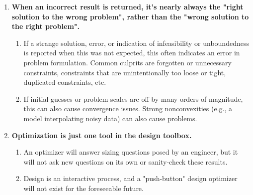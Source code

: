 \begin{enumerate}
\begin{enumerate}
        \item An optimizer only solves the problem that you give it. (And this is in the best case!) Often, it is easy to forget constraints that seem intuitively obvious.
        \item If any flaw exists in a physics model, the optimizer will exploit it. Models should extrapolate sensibly and generally be parsimonious. On objective functions, adding quadratic regularization is an effective last resort.
        \item Without special care, optimized designs are almost always fragile. An optimizer will tend to naturally drive to the edge of the feasible space. However, in nature\footnote{Mother Nature being arguably the most successful optimizer}, optima are usually not near extremes.
    \end{enumerate}
    \item \textbf{When an incorrect result is returned, it's nearly always the "right solution to the wrong problem", rather than the "wrong solution to the right problem".}
    \begin{enumerate}
        \item If a strange solution, error, or indication of infeasibility or unboundedness is reported when this was not expected, this often indicates an error in problem formulation. Common culprits are forgotten or unnecessary constraints, constraints that are unintentionally too loose or tight, duplicated constraints, etc.
        \item If initial guesses or problem scales are off by many orders of magnitude, this can also cause convergence issues. Strong nonconvexities (e.g., a model interpolating noisy data) can also cause problems.
    \end{enumerate}
    \item \textbf{Optimization is just one tool in the design toolbox.}
    \begin{enumerate}
        \item An optimizer will answer sizing questions posed by an engineer, but it will not ask new questions on its own or sanity-check these results.
        \item Design is an interactive process, and a "push-button" design optimizer will not exist for the foreseeable future.
    \end{enumerate}
\end{enumerate}